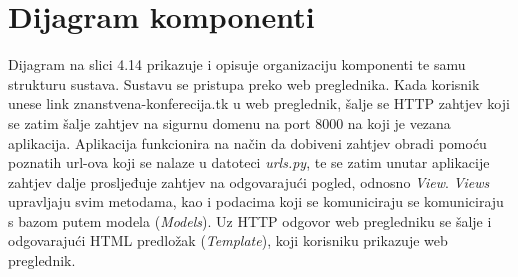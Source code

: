 			 \eject
			
			\eject
		\section{Dijagram komponenti}

			Dijagram na slici 4.14 prikazuje i opisuje organizaciju komponenti te samu strukturu sustava. Sustavu se pristupa preko web preglednika. Kada korisnik unese link znanstvena-konferecija.tk u web preglednik, šalje se HTTP zahtjev koji se zatim šalje zahtjev na sigurnu domenu na port 8000 na koji je vezana aplikacija. Aplikacija funkcionira na način da dobiveni zahtjev obradi pomoću poznatih url-ova koji se nalaze u datoteci \textit{urls.py}, te se zatim unutar aplikacije zahtjev dalje prosljeđuje zahtjev na odgovarajući pogled, odnosno \textit{View}. \textit{Views} upravljaju svim metodama, kao i podacima koji se komuniciraju se komuniciraju s bazom putem modela (\textit{Models}). Uz HTTP odgovor web pregledniku se šalje i odgovarajući HTML predložak (\textit{Template}), koji korisniku prikazuje web preglednik.

